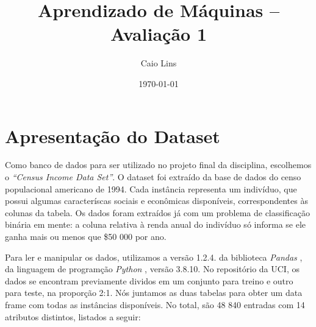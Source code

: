 \documentclass[a4paper, 12pt]{article}
\title{Aprendizado de Máquinas -- Avaliação 1}
\author{Caio Lins}
\date{\today}
\begin{document}
\maketitle

\section{Apresentação do Dataset}

Como banco de dados para ser utilizado no projeto final da disciplina, escolhemos o \emph{``Census Income Data Set''}\cite{uci}.
O dataset foi extraído da base de dados do censo populacional americano de 1994.
Cada instância representa um indivíduo, que possui algumas caracteríscas sociais e econômicas disponíveis, correspondentes às colunas da tabela.
Os dados foram extraídos já com um problema de classificação binária em mente: a coluna relativa à renda anual do indivíduo só informa se ele ganha mais ou menos que \$50 000 por ano.

Para ler e manipular os dados, utilizamos a versão 1.2.4. da biblioteca \emph{Pandas} \cite{pandas}, da linguagem de programção \emph{Python} \cite{python}, versão 3.8.10.
No repositório da UCI, os dados se encontram previamente dividos em um conjunto para treino e outro para teste, na proporção 2:1.
Nós juntamos as duas tabelas para obter um data frame com todas as instâncias disponíveis.
No total, são 48 840 entradas com 14 atributos distintos, listados a seguir:
\end{document}
